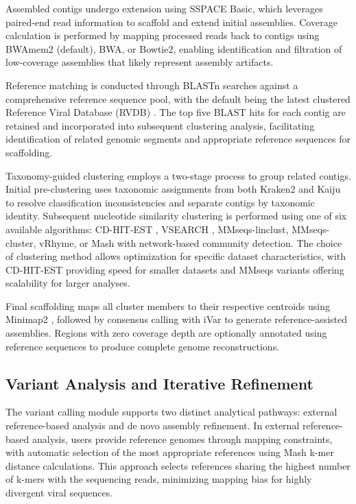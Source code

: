 \documentclass[unnumsec,webpdf,contemporary,large]{oup-authoring-template}%
\theoremstyle{thmstyleone}%
\theoremstyle{thmstyletwo}%
\theoremstyle{thmstylethree}%
\begin{document}
Assembled contigs undergo extension using SSPACE Basic, which leverages paired-end read information to scaffold and extend initial assemblies. Coverage calculation is performed by mapping processed reads back to contigs using BWAmem2 (default), BWA, or Bowtie2, enabling identification and filtration of low-coverage assemblies that likely represent assembly artifacts.

Reference matching is conducted through BLASTn searches against a comprehensive reference sequence pool, with the default being the latest clustered Reference Viral Database (RVDB) \cite{Goodacre2018-dw}. The top five BLAST hits for each contig are retained and incorporated into subsequent clustering analysis, facilitating identification of related genomic segments and appropriate reference sequences for scaffolding.

Taxonomy-guided clustering employs a two-stage process to group related contigs. Initial pre-clustering uses taxonomic assignments from both Kraken2 and Kaiju to resolve classification inconsistencies and separate contigs by taxonomic identity. Subsequent nucleotide similarity clustering is performed using one of six available algorithms: CD-HIT-EST \cite{Li2006-nj}, VSEARCH \cite{Rognes2016-ju}, MMseqs-linclust, MMseqs-cluster, vRhyme, or Mash with network-based community detection. The choice of clustering method allows optimization for specific dataset characteristics, with CD-HIT-EST providing speed for smaller datasets and MMseqs variants offering scalability for larger analyses.

Final scaffolding maps all cluster members to their respective centroids using Minimap2 \cite{Li2018-gi}, followed by consensus calling with iVar to generate reference-assisted assemblies. Regions with zero coverage depth are optionally annotated using reference sequences to produce complete genome reconstructions.

\subsection{Variant Analysis and Iterative Refinement}\label{subsec_variant}

The variant calling module supports two distinct analytical pathways: external reference-based analysis and de novo assembly refinement. In external reference-based analysis, users provide reference genomes through mapping constraints, with automatic selection of the most appropriate references using Mash \cite{Ondov2019-bo} k-mer distance calculations. This approach selects references sharing the highest number of k-mers with the sequencing reads, minimizing mapping bias for highly divergent viral sequences.
\end{document}
